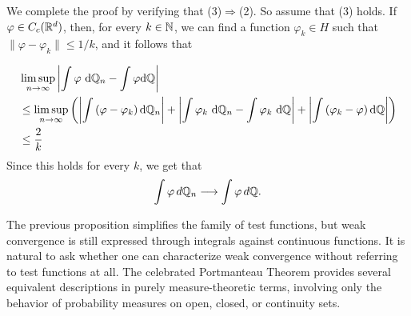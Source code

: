 \documentclass[../Main.tex]{subfiles}
\begin{document}
{We complete the proof by verifying that (3)$\Rightarrow$(2). So assume that (3) holds. If $\varphi \in C_c(\mathbb{R}^d)$, then, for every $k \in \mathbb{N}$, we can find a function $\varphi_k \in H$ such that
$\|\varphi-\varphi_k\|\le 1/k$, and it follows that

\begin{align*}
    & \limsup _{n \rightarrow \infty}\left|\int \varphi \mathrm{~d} \mathbb{Q}_n-\int \varphi \mathrm{d} \mathbb{Q}\right| \\
    & \leq \limsup _{n \rightarrow \infty}\left(\left|\int\left(\varphi-\varphi_k\right) \mathrm{d} \mathbb{Q}_n\right|+\left|\int \varphi_k \mathrm{~d} \mathbb{Q}_n-\int \varphi_k \mathrm{~d} \mathbb{Q}\right|+\left|\int\left(\varphi_k-\varphi\right) \mathrm{d} \mathbb{Q}\right|\right) \\
    & \leq \frac{2}{k}
\end{align*}
Since this holds for every $k$, we get that
\[\int \varphi\, d\mathbb{Q}_n \longrightarrow \int \varphi\, d\mathbb{Q}.\]
}

The previous proposition simplifies the family of test functions, but weak convergence is still expressed through integrals against continuous functions. It is natural to ask whether one can characterize weak convergence without referring to test functions at all. The celebrated Portmanteau Theorem provides several equivalent descriptions in purely measure-theoretic terms, involving only the behavior of probability measures on open, closed, or continuity sets.
\end{document}
